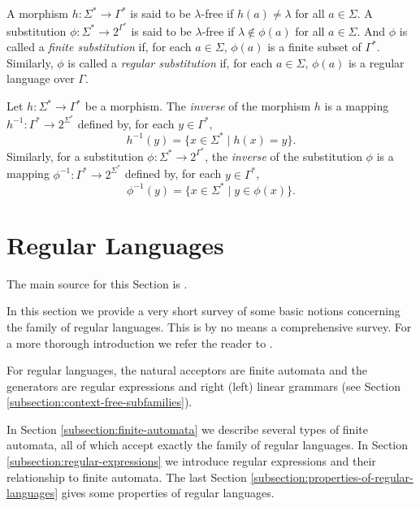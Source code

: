 A morphism $h: \Sigma^* \to \Gamma^*$ is said to be $\lambda$-free if $h(a) \neq \lambda$ for all $a \in \Sigma$. A substitution $\phi: \Sigma^* \to 2^{\Gamma^*}$ is said to be $\lambda$-free if $\lambda \notin \phi(a)$ for all $a \in \Sigma$. And $\phi$ is called a  \emph{finite substitution} if, for each $a \in \Sigma$, $\phi(a)$ is a finite subset of $\Gamma^*$. Similarly, $\phi$ is called a  \emph{regular substitution} if, for each $a \in \Sigma$, $\phi(a)$ is a regular language over $\Gamma$.

Let $h: \Sigma^* \to \Gamma^*$ be a morphism. The  \emph{inverse} of the morphism $h$ is a mapping $h^{-1}: \Gamma^* \to 2^{\Sigma^*}$ defined by, for each $y \in \Gamma^*$,
$$h^{-1}(y) = \{x \in \Sigma^* \mid h(x) = y\}.$$
Similarly, for a substitution $\phi: \Sigma^* \to 2^{\Gamma^*}$, the \emph{inverse} of the substitution $\phi$ is a mapping $\phi^{-1}: \Gamma^* \to 2^{\Sigma^*}$ defined by, for each $y \in \Gamma^*$,
$$\phi^{-1}(y) = \{x \in \Sigma^* \mid y \in \phi(x)\}.$$

\section{Regular Languages}
\label{section:regular-languages}

The main source for this Section is \cite{Sh1997regular}.

In this section we provide a very short survey of some basic notions concerning the family of regular languages. This is by no means a comprehensive survey. For a more thorough introduction we refer the reader to \cite{HopcroftMotwaniUllman07}.

For  regular languages, the natural acceptors are finite automata and the generators are regular expressions and right (left) linear grammars (see Section \ref{subsection:context-free-subfamilies}).

In Section \ref{subsection:finite-automata} we describe several types of finite automata, all of which accept exactly the family of regular languages. In Section \ref{subsection:regular-expressions} we introduce regular expressions and their relationship to finite automata. The last Section \ref{subsection:properties-of-regular-languages} gives some properties of regular languages.

